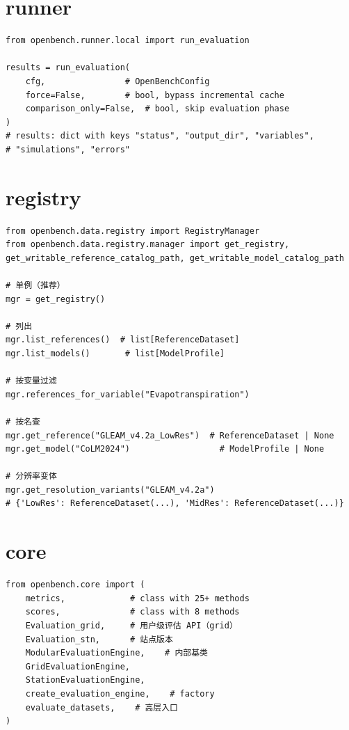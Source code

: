 \section{runner}

\begin{verbatim}
from openbench.runner.local import run_evaluation

results = run_evaluation(
    cfg,                # OpenBenchConfig
    force=False,        # bool, bypass incremental cache
    comparison_only=False,  # bool, skip evaluation phase
)
# results: dict with keys "status", "output_dir", "variables",
# "simulations", "errors"
\end{verbatim}

\section{registry}

\begin{verbatim}
from openbench.data.registry import RegistryManager
from openbench.data.registry.manager import get_registry, get_writable_reference_catalog_path, get_writable_model_catalog_path

# 单例（推荐）
mgr = get_registry()

# 列出
mgr.list_references()  # list[ReferenceDataset]
mgr.list_models()       # list[ModelProfile]

# 按变量过滤
mgr.references_for_variable("Evapotranspiration")

# 按名查
mgr.get_reference("GLEAM_v4.2a_LowRes")  # ReferenceDataset | None
mgr.get_model("CoLM2024")                  # ModelProfile | None

# 分辨率变体
mgr.get_resolution_variants("GLEAM_v4.2a")
# {'LowRes': ReferenceDataset(...), 'MidRes': ReferenceDataset(...)}
\end{verbatim}

\section{core}

\begin{verbatim}
from openbench.core import (
    metrics,             # class with 25+ methods
    scores,              # class with 8 methods
    Evaluation_grid,     # 用户级评估 API（grid）
    Evaluation_stn,      # 站点版本
    ModularEvaluationEngine,    # 内部基类
    GridEvaluationEngine,
    StationEvaluationEngine,
    create_evaluation_engine,    # factory
    evaluate_datasets,    # 高层入口
)
\end{verbatim}

